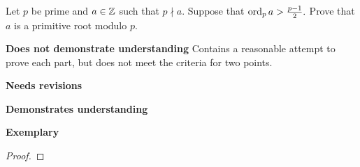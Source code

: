 \documentclass[letterpaper, 11pt]{../ximera}
\begin{document}
\begin{ex}
	Let $p$ be prime and $a\in\mathbb Z$ such that $p\nmid a.$ Suppose that $\operatorname{ord}_p a> \frac{p-1}{2}.$ Prove that $a$ is a primitive root modulo $p.$
\end{ex}

\begin{writeRubric}
    \item \textbf{Does not demonstrate understanding}
     Contains a reasonable attempt to prove each part, but does not meet the criteria for two points.
    \item \textbf{Needs revisions}
     
    \item \textbf{Demonstrates understanding}
    
    \item \textbf{Exemplary}
        
\end{writeRubric}
                                       
\begin{proof}
 
\end{proof}

\end{document}
